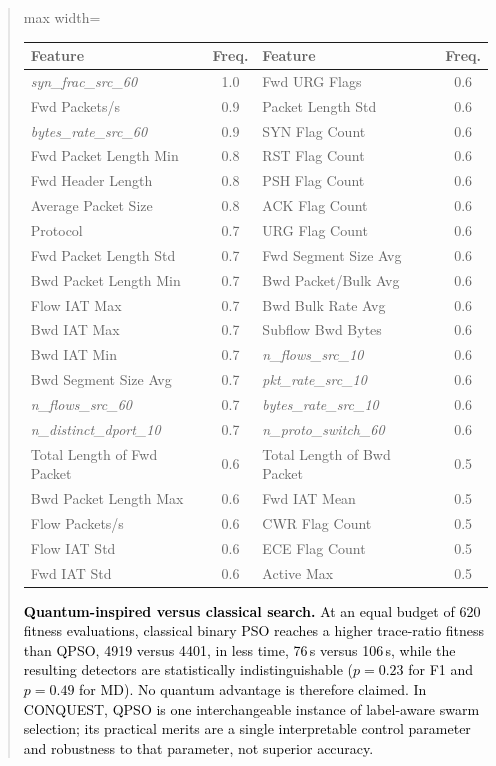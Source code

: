 \documentclass[11pt]{article}
\newenvironment{excerpt}{\begin{quote}\sloppy}{\end{quote}}
\begin{document}
\begin{excerpt}
\begin{table}[H]
\color{black}
\setlength{\tabcolsep}{2.5pt}
\renewcommand{\arraystretch}{1.02}
\begin{adjustbox}{max width=\linewidth}
\begin{tabular}{>{\raggedright\arraybackslash}p{3.0cm}c >{\raggedright\arraybackslash}p{3.0cm}c}
\hline\toprule
Feature & Freq. & Feature & Freq. \\
\hline\toprule
\textit{syn\_frac\_src\_60} & 1.0 & Fwd URG Flags & 0.6 \\
Fwd Packets/\allowbreak s & 0.9 & Packet Length Std & 0.6 \\
\textit{bytes\_rate\_src\_60} & 0.9 & SYN Flag Count & 0.6 \\
Fwd Packet Length Min & 0.8 & RST Flag Count & 0.6 \\
Fwd Header Length & 0.8 & PSH Flag Count & 0.6 \\
Average Packet Size & 0.8 & ACK Flag Count & 0.6 \\
Protocol & 0.7 & URG Flag Count & 0.6 \\
Fwd Packet Length Std & 0.7 & Fwd Segment Size Avg & 0.6 \\
Bwd Packet Length Min & 0.7 & Bwd Packet/\allowbreak Bulk Avg & 0.6 \\
Flow IAT Max & 0.7 & Bwd Bulk Rate Avg & 0.6 \\
Bwd IAT Max & 0.7 & Subflow Bwd Bytes & 0.6 \\
Bwd IAT Min & 0.7 & \textit{n\_flows\_src\_10} & 0.6 \\
Bwd Segment Size Avg & 0.7 & \textit{pkt\_rate\_src\_10} & 0.6 \\
\textit{n\_flows\_src\_60} & 0.7 & \textit{bytes\_rate\_src\_10} & 0.6 \\
\textit{n\_distinct\_dport\_10} & 0.7 & \textit{n\_proto\_switch\_60} & 0.6 \\
Total Length of Fwd Packet & 0.6 & Total Length of Bwd Packet & 0.5 \\
Bwd Packet Length Max & 0.6 & Fwd IAT Mean & 0.5 \\
Flow Packets/\allowbreak s & 0.6 & CWR Flag Count & 0.5 \\
Flow IAT Std & 0.6 & ECE Flag Count & 0.5 \\
Fwd IAT Std & 0.6 & Active Max & 0.5 \\
\hline\toprule
\end{tabular}
\end{adjustbox}
\end{table}

\textcolor{black}{\textbf{Quantum-inspired versus classical
search.} At an equal budget of 620 fitness evaluations, classical
binary PSO reaches a higher trace-ratio fitness than QPSO, 4919
versus 4401, in less time, 76\,s versus 106\,s, while the resulting
detectors are statistically indistinguishable ($p=0.23$ for F1 and
$p=0.49$ for MD). No quantum advantage is therefore claimed. In
CONQUEST, QPSO is one interchangeable instance of label-aware swarm
selection; its practical merits are a single interpretable control
parameter and robustness to that parameter, not superior accuracy.}


\end{excerpt}
\end{document}
